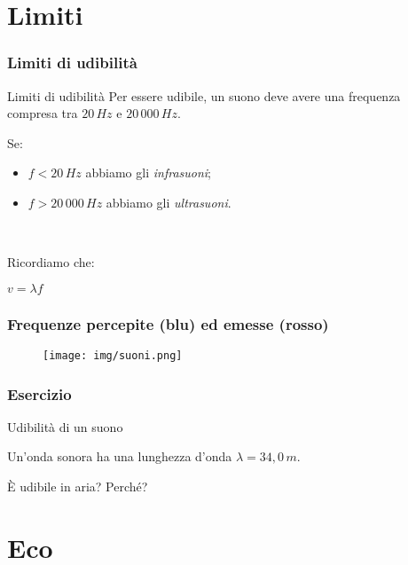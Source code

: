 \documentclass[]{beamer}
\theoremstyle{plain}
\begin{document}
\section{Limiti}

\begin{frame}
\frametitle{Limiti di udibilità}
\begin{block}{Limiti di udibilità}
Per essere udibile, un suono deve avere una frequenza compresa tra $ 20 \, Hz $ e $ 20 \, 000 \, Hz $.
\end{block}
Se:\begin{itemize}
  \item $ f < 20 \, Hz $ abbiamo gli \emph{infrasuoni}; 
  \item $ f > 20\, 000 \, Hz $ abbiamo gli \emph{ultrasuoni}.
\end{itemize}\pause

~

Ricordiamo che:
\begin{center}
$ v = \lambda f $
\end{center}
\end{frame}


\begin{frame}
\frametitle{Frequenze percepite (blu) ed emesse (rosso)}
\begin{figure}
\texttt{[image: img/suoni.png]}
\end{figure}
\end{frame}



\begin{frame}
\frametitle{Esercizio}
\begin{exampleblock}{Udibilità di un suono}
\small{Un'onda sonora ha una lunghezza d'onda $ \lambda = 34,0 \, m $. 

È udibile in aria? Perché?}
\end{exampleblock}
\end{frame}

\section{Eco}
\end{document}
